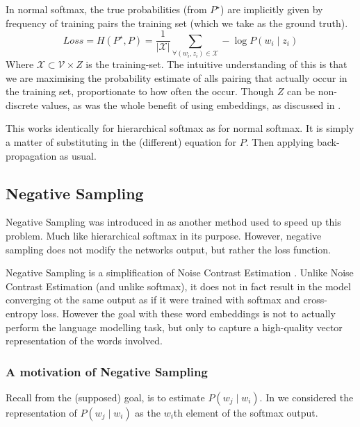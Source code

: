 \documentclass[parskip]{komatufte}
\begin{document}
In normal softmax, the true probabilities (from $P^\star$) are implicitly given by frequency of training pairs the training set (which we take as the ground truth).
\begin{equation}
Loss=H(P^\star, P) = \frac{1}{|\mathcal{X}|} \sum_{\forall (w_i, z_i) \in \mathcal{X}} -\log P(w_i \mid z_i)
\end{equation}
Where $\mathcal{X} \subset \mathcal{V} \times Z$ is the training-set.
The intuitive understanding of this is that we are maximising the probability estimate of alls pairing that actually occur in the training set, proportionate to how often the occur.
Though $Z$ can be non-discrete values, as was the whole benefit of using embeddings, as discussed in .

This works identically for hierarchical softmax as for normal softmax.
It is simply a matter of substituting in the (different) equation for $P$.
Then applying back-propagation as usual.

\subsection{Negative Sampling}


Negative Sampling was introduced in  as another method used to speed up this problem.
Much like hierarchical softmax in its purpose.
However, negative sampling does not modify the networks output, but rather the loss function.


Negative Sampling is a simplification of Noise Contrast Estimation .
Unlike Noise Contrast Estimation (and unlike softmax), it does not in fact result in the model converging ot the same output as if it were trained with softmax and cross-entropy loss.
However the goal with these word embeddings is not to actually perform the language modelling task, but only to capture a high-quality vector representation of the words involved.

\subsubsection{A motivation of Negative Sampling}
Recall from  the (supposed) goal, is to estimate $P(w_j\mid w_i)$.
In    we considered the representation of $P(w_j\mid w_i)$ as the $w_i$th element of the softmax output.
\end{document}
